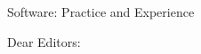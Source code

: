 \documentclass{letter}
\date{August 19, 2022}
\begin{document}
\begin{letter}{
Software: Practice and Experience
}

\vspace*{-10em}
\hspace*{-3em}
\noindent
{}
\vspace*{10em}

\opening{Dear Editors:}


\end{letter}
\end{document}

